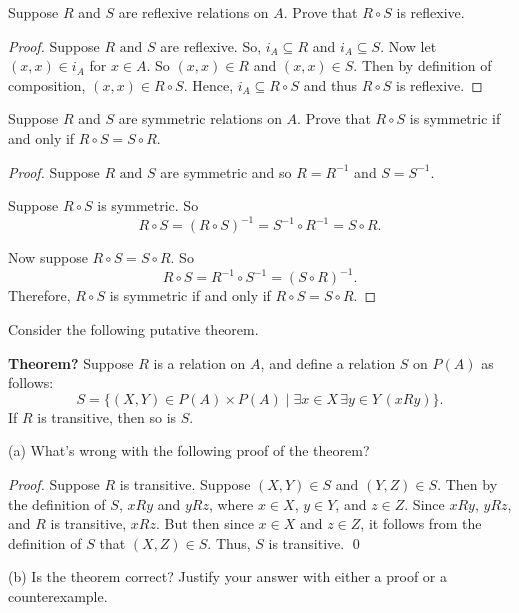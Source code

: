 \documentclass[12pt]{article}
\newenvironment{exercise}[2][Exercise]{\begin{trivlist}
\item[\hskip \labelsep {\bfseries #1}\hskip \labelsep {\bfseries #2.}]}{\end{trivlist}}
\newcommand{\nd}{\text{ and }}
\begin{document}
\begin{exercise}
	{16}
	Suppose \( R \) and \( S \) are reflexive relations on \( A \). Prove that \( R \circ S \) is reflexive.
\end{exercise}

\begin{proof}
	Suppose $R \nd S$ are reflexive. So, $i_{A} \subseteq R$ and $i_{A} \subseteq S$. Now let $(x,x)\in i_{A} $ for $x\in A$. So $(x,x)\in R$ and $(x,x)\in S$. Then by definition of composition, $(x,x)\in R\circ S$. Hence, $i_{A} \subseteq R\circ S$ and thus $R\circ S$ is reflexive.          
\end{proof}

\begin{exercise}
	{17}
	Suppose \( R \) and \( S \) are symmetric relations on \( A \). Prove that \( R \circ S \) is symmetric if and only if \( R \circ S = S \circ R \).	
\end{exercise}

\begin{proof}
	Suppose $R \nd S$ are symmetric and so $R=R^{-1} $ and $S=S^{-1}$.
	
	Suppose $R\circ S$ is symmetric. So $$R\circ S=(R\circ S)^{-1} =S^{-1} \circ R^{-1} =S\circ R.$$

	Now suppose $R\circ S=S\circ R$. So
	\[
		R\circ S=R^{-1} \circ S^{-1} =(S\circ R)^{-1}.
	\] 
	Therefore, $R\circ S$ is symmetric if and only if $R\circ S=S\circ R$.   
\end{proof}

\begin{exercise}
	{19}
	Consider the following putative theorem.

	\textbf{Theorem?} Suppose \( R \) is a relation on \( A \), and define a relation \( S \) on \( P(A) \) as follows:
	\[
	S = \{ (X, Y) \in P(A) \times P(A) \mid \exists x \in X \, \exists y \in Y \, (x R y) \}.
	\]
	If \( R \) is transitive, then so is \( S \).
	
	(a) What’s wrong with the following proof of the theorem?
	
	\textit{Proof.} Suppose \( R \) is transitive. Suppose \( (X, Y) \in S \) and \( (Y , Z) \in S \). Then by the definition of \( S \), \( x R y \) and \( y R z \), where \( x \in X \), \( y \in Y \), and \( z \in Z \). Since \( x R y \), \( y R z \), and \( R \) is transitive, \( x R z \). But then since \( x \in X \) and \( z \in Z \), it follows from the definition of \( S \) that \( (X, Z) \in S \). Thus, \( S \) is transitive. \qed
	
	(b) Is the theorem correct? Justify your answer with either a proof or a counterexample.
\end{exercise}
\end{document}
